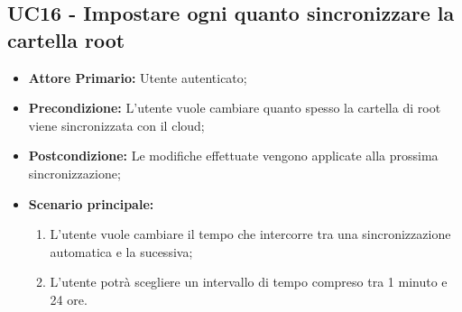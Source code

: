 \subsection{UC16 - Impostare ogni quanto sincronizzare la cartella root}
\label{UC16}
\begin{itemize}
\item \textbf{Attore Primario:} Utente autenticato;
\item \textbf{Precondizione:} L'utente vuole cambiare quanto spesso la cartella di root viene sincronizzata con il cloud;
\item \textbf{Postcondizione:} Le modifiche effettuate vengono applicate alla prossima sincronizzazione;
\item \textbf{Scenario principale:} 
\begin{enumerate}
\item L'utente vuole cambiare il tempo che intercorre tra una sincronizzazione automatica e la sucessiva;
\item L'utente potrà scegliere un intervallo di tempo compreso tra 1 minuto e 24 ore.
\end{enumerate}
\end{itemize}